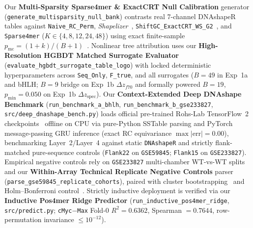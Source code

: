 \documentclass[11pt,a4paper]{article}
\begin{document}
Our \textbf{Multi-Sparsity Sparse4mer \& ExactCRT Null Calibration} generator (\texttt{generate\_multisparsity\_null\_bank}) contrasts real 7-channel DNAshapeR tables against \texttt{Naive\_RC\_Perm}, \emph{Shapelizer}~\cite{rube2018msb}, \texttt{ShiftGC\_ExactCRT\_WS\_G2}~\cite{candes2018jrssb,berrett2020jrssb}, and \texttt{Sparse4mer} ($K \in \{4, 8, 12, 24, 48\}$) using exact finite-sample $p_{\mathrm{mc}} = (1 + k)/(B + 1)$~\cite{phipson2010sagmb}. Nonlinear tree attribution uses our \textbf{High-Resolution HGBDT Matched Surrogate Evaluator} (\texttt{evaluate\_hgbdt\_surrogate\_table\_logo}) with locked deterministic hyperparameters across \texttt{Seq\_Only}, \texttt{F\_true}, and all surrogates ($B = 49$ in Exp~1a and bHLH; $B = 9$ bridge on Exp~1b $\Delta z_{f70}$ and formally powered $B = 19$, $p_{\min} = 0.050$ on Exp~1b $\Delta z_{\mathrm{spec}}$). Our \textbf{Context-Extended Deep DNAshape Benchmark} (\texttt{run\_benchmark\_a\_bhlh}, \texttt{run\_benchmark\_b\_gse233827}, \texttt{src/deep\_dnashape\_bench.py}) loads official pre-trained Rohs-Lab TensorFlow~2 checkpoints~\cite{li2024natcomm,li2024nar} offline on CPU via pure-Python SSTable parsing and PyTorch message-passing GRU inference (exact RC equivariance $\max |\mathrm{err}| = 0.00$), benchmarking Layer~2/Layer~4 against static \texttt{DNAshapeR} and strictly flank-matched pure-sequence controls (\texttt{Flank22} on \texttt{GSE59845}; \texttt{Flank15} on \texttt{GSE233827}). Empirical negative controls rely on \texttt{GSE233827} multi-chamber WT-vs-WT splits and our \textbf{Within-Array Technical Replicate Negative Controls} parser (\texttt{parse\_gse59845\_replicate\_cohorts}), paired with cluster bootstrapping~\cite{efron1993boot,cameron2008restat} and Holm--Bonferroni control~\cite{holm1979scand}. Strictly inductive deployment is verified via our \textbf{Inductive Pos4mer Ridge Predictor} (\texttt{run\_inductive\_pos4mer\_ridge}, \texttt{src/predict.py}; \texttt{cMyc$-$Max} Fold-0 $R^2 = 0.6362$, Spearman $= 0.7644$, row-permutation invariance $\le 10^{-12}$).



\end{document}
